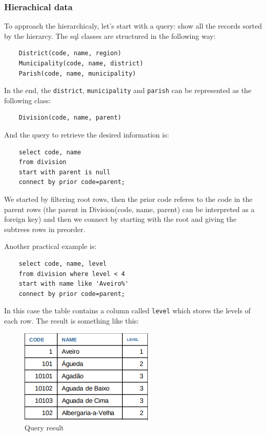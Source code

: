 \subsubsection{Hierachical data}
To approach the hierarchicaly, let's start with a query: show all the records sorted by the hierarcy. The sql classes are structured in the following way:

\begin{lstlisting}
    District(code, name, region)
    Municipality(code, name, district)
    Parish(code, name, municipality)
\end{lstlisting} 

In the end, the \texttt{district}, \texttt{municipality} and \texttt{parish} can be represented as the following class:

\begin{lstlisting}
    Division(code, name, parent)
\end{lstlisting} 

And the query to retrieve the desired information is:

\begin{lstlisting}
    select code, name
    from division 
    start with parent is null
    connect by prior code=parent; 
\end{lstlisting}

We started by filtering root rows, then the prior code referes to the code in the parent rows (the parent in Division(code, name, parent) can be interpreted as a foreign key) and then we connect by starting with the root and giving the subtrees rows in preorder. 

Another practical example is:
\begin{lstlisting}
    select code, name, level
    from division where level < 4 
    start with name like 'Aveiro%'
    connect by prior code=parent; 
\end{lstlisting} 

In this case the table contains a column called \texttt{level} which stores the levels of each row. The result is something like this:

\begin{figure}[h]
    \centering
    \includegraphics[width=0.4\linewidth]{figures/hierarchicalquery.png}
    \caption{Query result}
    \label{fig:hierarchicalquery}
\end{figure}

